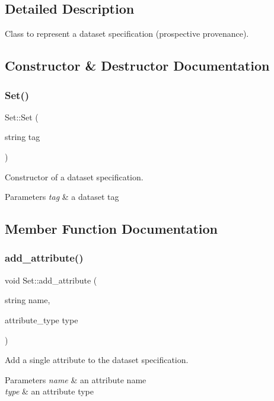 \subsection{Detailed Description}
Class to represent a dataset specification (prospective provenance). 

\subsection{Constructor \& Destructor Documentation}
\mbox{\label{classSet_ac47789261e41ac7aff516db5ea9e0095}} 
\subsubsection{\texorpdfstring{Set()}{Set()}}
{\footnotesize\ttfamily Set\+::\+Set (\begin{DoxyParamCaption}\item[{string}]{tag }\end{DoxyParamCaption})\hspace{0.3cm}{\ttfamily [inline]}}

Constructor of a dataset specification. 
\begin{DoxyParams}{Parameters}
{\em tag} & a dataset tag \\
\hline
\end{DoxyParams}


\subsection{Member Function Documentation}
\mbox{\label{classSet_ab4e7a2a958c8cfbac96f60c7c2b20c35}} 
\subsubsection{\texorpdfstring{add\+\_\+attribute()}{add\_attribute()}}
{\footnotesize\ttfamily void Set\+::add\+\_\+attribute (\begin{DoxyParamCaption}\item[{string}]{name,  }\item[{attribute\+\_\+type}]{type }\end{DoxyParamCaption})}

Add a single attribute to the dataset specification. 
\begin{DoxyParams}{Parameters}
{\em name} & an attribute name \\
\hline
{\em type} & an attribute type \\
\hline
\end{DoxyParams}
\mbox{\label{classSet_a90b6137ad3bbb7a34b50fa5e7842a685}} 
